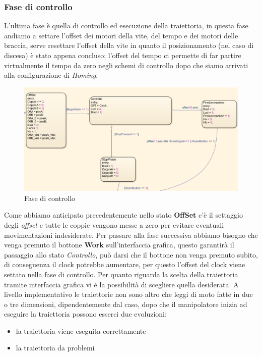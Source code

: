 \subsubsection{Fase di controllo}
L'ultima fase è quella di controllo ed esecuzione della traiettoria, in questa fase andiamo a settare l'offset dei motori della vite, del tempo e dei motori delle braccia, serve resettare l'offset della vite in quanto il posizionamento (nel caso di discesa) è stato appena concluso; l'offset del tempo ci permette di far partire virtualmente il tempo da zero negli schemi di controllo dopo che siamo arrivati alla configurazione di \textit{Homing}.
\begin{figure}[ht]
\begin{center}
    \includegraphics[scale=0.6]{Immagini/Sperimentale/state3New.png}
    \caption{Fase di controllo}
    \label{fig:Traiettoria}
\end{center}
\end{figure}
Come abbiamo anticipato precedentemente nello stato \textbf{OffSet} c'è il settaggio degli \textit{offset} e tutte le coppie vengono messe a zero per evitare eventuali movimentazioni indesiderate. Per passare alla fase successiva abbiamo bisogno che venga premuto il bottone \textbf{Work} sull'interfaccia grafica, questo garantirà il passaggio allo stato \textit{Controllo}, può darsi che il bottone non venga premuto subito, di conseguenza il clock potrebbe aumentare, per questo l'offset del clock viene settato nella fase di controllo. Per quanto riguarda la scelta della traiettoria tramite interfaccia grafica vi è la possibilità di scegliere quella desiderata. A livello implementativo le traiettorie non sono altro che leggi di moto fatte in due o tre dimensioni, dipendentemente dal caso, dopo che il manipolatore inizia ad eseguire la traiettoria possono esserci due evoluzioni:
\begin{itemize}
	\item la traiettoria viene eseguita correttamente
	\item la traiettoria da problemi
\end{itemize}
